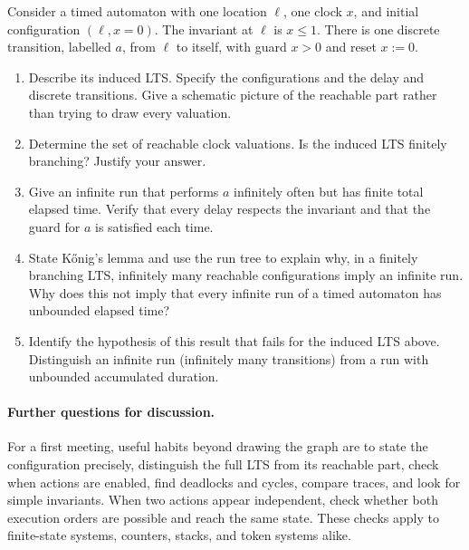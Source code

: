 \documentclass{tutorial}
\begin{document}
\begin{exercise}
Consider a timed automaton with one location $\ell$, one clock $x$, and
initial configuration $(\ell,x=0)$. The invariant at $\ell$ is $x\leq 1$.
There is one discrete transition, labelled $a$, from $\ell$ to itself,
with guard $x>0$ and reset $x:=0$.
\begin{enumerate}
  \item Describe its induced LTS. Specify the configurations and the
        delay and discrete transitions. Give a schematic picture of the
        reachable part rather than trying to draw every valuation.
  \item Determine the set of reachable clock valuations. Is the induced
        LTS finitely branching? Justify your answer.
  \item Give an infinite run that performs $a$ infinitely often but has
        finite total elapsed time. Verify that every delay respects the
        invariant and that the guard for $a$ is satisfied each time.
  \item State K\H{o}nig's lemma and use the run tree to explain why, in a
        finitely branching LTS, infinitely many reachable configurations
        imply an infinite run. Why does this not imply that every infinite
        run of a timed automaton has unbounded elapsed time?
  \item Identify the hypothesis of this result that fails for the induced
        LTS above. Distinguish an infinite run (infinitely many transitions)
        from a run with unbounded accumulated duration.
\end{enumerate}
\end{exercise}

\paragraph{Further questions for discussion.}
For a first meeting, useful habits beyond drawing the graph are to state
the configuration precisely, distinguish the full LTS from its reachable
part, check when actions are enabled, find deadlocks and cycles, compare
traces, and look for simple invariants. When two actions appear independent,
check whether both execution orders are possible and reach the same state.
These checks apply to finite-state systems, counters, stacks, and token
systems alike.
\end{document}
